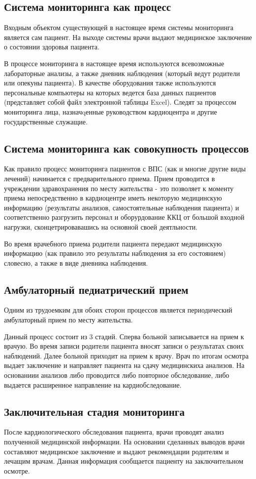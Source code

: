 \subsection{Система мониторинга как процесс}

Входным объектом существующей в настоящее время системы мониторинга является сам
пациент. На выходе системы врачи выдают медицинское заключение о состоянии
здоровья пациента.

В процессе мониторинга в настоящее время используются всевозможные лабораторные
анализы, а также дневник наблюдения (который ведут родители или опекуны
пациента). В качестве оборудования также используются персональные компьютеры на
которых ведется база данных пациентов (представляет собой файл электронной
таблицы Excel). Следят за процессом мониторинга лица, назначqенные руководством
кардиоцентра и другие государственные служащие.

\subsection{Система мониторинга как совокупность процессов}

Как правило процесс мониторинга пациентов с ВПС (как и многие другие виды
лечений) начинается с предварительного приема. Прием проводится в учреждении
здравохранения по месту жительства - это позволяет к моменту приема
непосредственно в кардиоцентре  иметь некоторую медицинскую информацию
(результаты анализов, самостоятельные наблюдения пациента) и соответственно
разгрузить персонал и оборурдование ККЦ от большой входной нагрузки,
сконцетрировавашись на основной своей деятльности.

Во время врачебного приема родители пациента передают медицинскую информацию
(как правило это результаты наблюдения за его состоянием) словесно, а также  в
виде дневника наблюдения.

\subsection{Амбулаторный педиатрический прием}

Одним из трудоемким для обоих сторон процессов является периодический
амбулаторный прием по месту жительства.

Данный процесс состоит из 3 стадий. Сперва больной записывается на прием к
врачую. Во время записи родители пациента вносят записи о результатах своих
наблюдений. Далее больной приходит на прием к врачу. Врач по итогам осмотра
выдает заключение и направляет пациента на сдачу медицинскиха анализов. На
основаниии анализов либо проводится либо повторное обследование, либо выдается
расширенное направление на кардиобследование.

\subsection{Заключительная стадия мониторинга}

После кардиологического обследования пациента, врачи проводят анализ полученной
медицинской информации. На основании сделанных выводов врачи составляют
медицинское заключение и выдают рекомендации родителям и лечащим врачам. Данная
информация сообщается пациенту на заключительном осмотре.
